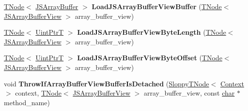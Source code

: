 \begin{DoxyCompactItemize}
\item 
\mbox{\label{classv8_1_1internal_1_1CodeStubAssembler_a2a6cde680557639286624e051a9f6d80}} 
\mbox{\hyperlink{classv8_1_1internal_1_1compiler_1_1TNode}{T\+Node}}$<$ \mbox{\hyperlink{classv8_1_1internal_1_1JSArrayBuffer}{J\+S\+Array\+Buffer}} $>$ {\bfseries Load\+J\+S\+Array\+Buffer\+View\+Buffer} (\mbox{\hyperlink{classv8_1_1internal_1_1compiler_1_1TNode}{T\+Node}}$<$ \mbox{\hyperlink{classv8_1_1internal_1_1JSArrayBufferView}{J\+S\+Array\+Buffer\+View}} $>$ array\+\_\+buffer\+\_\+view)
\item 
\mbox{\label{classv8_1_1internal_1_1CodeStubAssembler_ae42ec21ef6acd15403931144757853a1}} 
\mbox{\hyperlink{classv8_1_1internal_1_1compiler_1_1TNode}{T\+Node}}$<$ \mbox{\hyperlink{structv8_1_1internal_1_1UintPtrT}{Uint\+PtrT}} $>$ {\bfseries Load\+J\+S\+Array\+Buffer\+View\+Byte\+Length} (\mbox{\hyperlink{classv8_1_1internal_1_1compiler_1_1TNode}{T\+Node}}$<$ \mbox{\hyperlink{classv8_1_1internal_1_1JSArrayBufferView}{J\+S\+Array\+Buffer\+View}} $>$ array\+\_\+buffer\+\_\+view)
\item 
\mbox{\label{classv8_1_1internal_1_1CodeStubAssembler_a0787a402625e6827f15292adfc958dc3}} 
\mbox{\hyperlink{classv8_1_1internal_1_1compiler_1_1TNode}{T\+Node}}$<$ \mbox{\hyperlink{structv8_1_1internal_1_1UintPtrT}{Uint\+PtrT}} $>$ {\bfseries Load\+J\+S\+Array\+Buffer\+View\+Byte\+Offset} (\mbox{\hyperlink{classv8_1_1internal_1_1compiler_1_1TNode}{T\+Node}}$<$ \mbox{\hyperlink{classv8_1_1internal_1_1JSArrayBufferView}{J\+S\+Array\+Buffer\+View}} $>$ array\+\_\+buffer\+\_\+view)
\item 
\mbox{\label{classv8_1_1internal_1_1CodeStubAssembler_a08af23dc4a10d8a7b14636393c01e231}} 
void {\bfseries Throw\+If\+Array\+Buffer\+View\+Buffer\+Is\+Detached} (\mbox{\hyperlink{classv8_1_1internal_1_1compiler_1_1SloppyTNode}{Sloppy\+T\+Node}}$<$ \mbox{\hyperlink{classv8_1_1internal_1_1Context}{Context}} $>$ context, \mbox{\hyperlink{classv8_1_1internal_1_1compiler_1_1TNode}{T\+Node}}$<$ \mbox{\hyperlink{classv8_1_1internal_1_1JSArrayBufferView}{J\+S\+Array\+Buffer\+View}} $>$ array\+\_\+buffer\+\_\+view, const \mbox{\hyperlink{classchar}{char}} $\ast$method\+\_\+name)
\item 

\end{DoxyCompactItemize}
